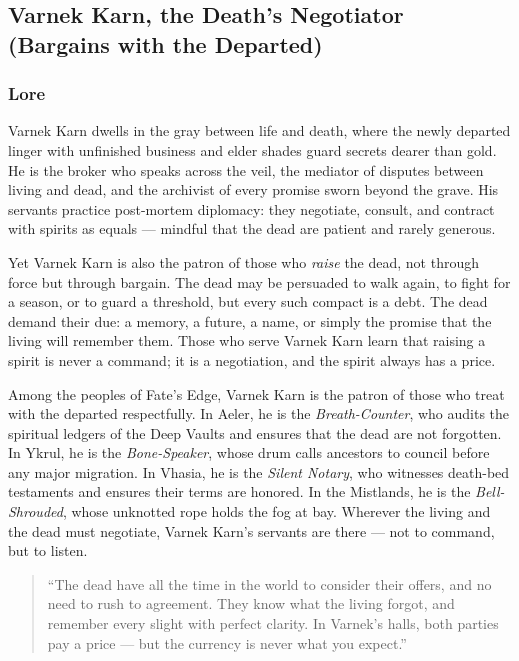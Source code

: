 
\subsection{Varnek Karn, the Death's Negotiator (Bargains with the Departed)}

\subsubsection*{Lore}
Varnek Karn dwells in the gray between life and death, where the newly departed linger with unfinished business and elder shades guard secrets dearer than gold. He is the broker who speaks across the veil, the mediator of disputes between living and dead, and the archivist of every promise sworn beyond the grave. His servants practice post-mortem diplomacy: they negotiate, consult, and contract with spirits as equals --- mindful that the dead are patient and rarely generous.

Yet Varnek Karn is also the patron of those who \textit{raise} the dead, not through force but through bargain. The dead may be persuaded to walk again, to fight for a season, or to guard a threshold, but every such compact is a debt. The dead demand their due: a memory, a future, a name, or simply the promise that the living will remember them. Those who serve Varnek Karn learn that raising a spirit is never a command; it is a negotiation, and the spirit always has a price.

Among the peoples of Fate's Edge, Varnek Karn is the patron of those who treat with the departed respectfully. In Aeler, he is the \textit{Breath-Counter}, who audits the spiritual ledgers of the Deep Vaults and ensures that the dead are not forgotten. In Ykrul, he is the \textit{Bone-Speaker}, whose drum calls ancestors to council before any major migration. In Vhasia, he is the \textit{Silent Notary}, who witnesses death-bed testaments and ensures their terms are honored. In the Mistlands, he is the \textit{Bell-Shrouded}, whose unknotted rope holds the fog at bay. Wherever the living and the dead must negotiate, Varnek Karn's servants are there --- not to command, but to listen.

\begin{quote}
``The dead have all the time in the world to consider their offers, and no need to rush to agreement. They know what the living forgot, and remember every slight with perfect clarity. In Varnek's halls, both parties pay a price --- but the currency is never what you expect.''
\end{quote}

